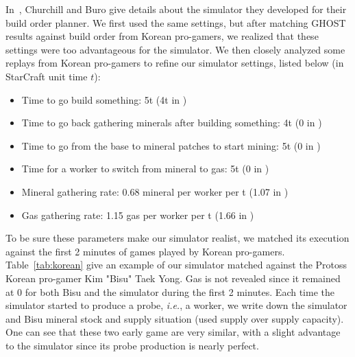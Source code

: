 \documentclass{article}
\newcommand{\ghost}{\textsc{GHOST}\xspace}
\newcommand{\ie}{\textit{i.e.}}
\begin{document}
In~\cite{ChurchillB11},  Churchill and  Buro  give  details about  the
simulator they developed for their build order planner.  We first used
the same  settings, but  after matching  \ghost results  against build
order from Korean pro-gamers, we realized that these settings were too
advantageous for the simulator.  We then closely analyzed some replays
from Korean pro-gamers to refine  our simulator settings, listed below
(in StarCraft unit time $t$):
\begin{itemize}
\item Time to go build something: 5t (4t in \cite{ChurchillB11})
\item Time to go back  gathering minerals after building something: 4t
  (0 in \cite{ChurchillB11})
\item Time to go from the base  to mineral patches to start mining: 5t
  (0 in \cite{ChurchillB11})
\item  Time for  a worker  to  switch from  mineral  to gas:  5t (0  in
  \cite{ChurchillB11})
\item Mineral gathering  rate: 0.68 mineral per worker per  t (1.07 in
  \cite{ChurchillB11})
\item  Gas  gathering  rate:  1.15  gas per  worker  per  t  (1.66  in
  \cite{ChurchillB11})
\end{itemize}  
To be sure these parameters make our simulator realist, we matched its
execution  against the  first  2  minutes of  games  played by  Korean
pro-gamers. Table~\ref{tab:korean}  give an  example of  our simulator
matched against the Protoss Korean pro-gamer Kim "Bisu" Taek Yong. Gas
is not revealed since it remained at 0 for both Bisu and the simulator
during the first 2 minutes. Each time the simulator started to produce
a probe, \ie,  a worker, we write down the  simulator and Bisu mineral
stock and supply situation (used supply over supply capacity). One can
see  that  these two  early  game  are  very  similar, with  a  slight
advantage  to  the simulator  since  its  probe production  is  nearly
perfect.
\end{document}

